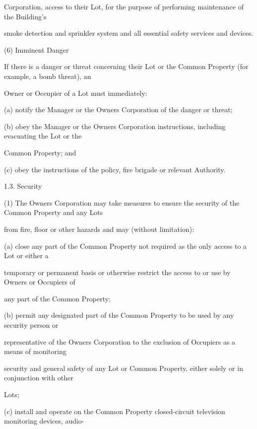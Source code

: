 \documentclass{article}
\begin{document}
{\fontsize{10.02}{1}Corporation, access to their Lot, for the purpose of performing maintenance of the Building’s }

{\fontsize{10.02}{1}smoke detection and sprinkler system and all essential safety services and devices. }

{\fontsize{9.962}{1}(6) Imminent Danger }

{\fontsize{10.02}{1}If there is a danger or threat concerning their Lot or the Common Property (for example, a bomb threat), an }

{\fontsize{10.02}{1}Owner or Occupier of a Lot must immediately: }

{\fontsize{9.962}{1}(a) notify the Manager or the Owners Corporation of the danger or threat; }

{\fontsize{9.962}{1}(b) obey the Manager or the Owners Corporation instructions, including evacuating the Lot or the }

{\fontsize{10.02}{1}Common Property; and }

{\fontsize{9.962}{1}(c) obey the instructions of the policy, fire brigade or relevant Authority. }

{\fontsize{9.99}{1}1.3. Security }

{\fontsize{9.962}{1}(1) The Owners Corporation may take measures to ensure the security of the Common Property and any Lots }

{\fontsize{10.02}{1}from fire, floor or other hazards and may (without limitation): }

{\fontsize{9.962}{1}(a) close any part of the Common Property not required as the only access to a Lot or either a }

{\fontsize{10.02}{1}temporary or permanent basis or otherwise restrict the access to or use by Owners or Occupiers of }

{\fontsize{10.02}{1}any part of the Common Property; }

{\fontsize{9.962}{1}(b) permit any designated part of the Common Property to be used by any security person or }

{\fontsize{10.02}{1}representative of the Owners Corporation to the exclusion of Occupiers as a means of monitoring }

{\fontsize{10.02}{1}security and general safety of any Lot or Common Property, either solely or in conjunction with other }

{\fontsize{10.02}{1}Lots; }

{\fontsize{9.962}{1}(c) install and operate on the Common Property closed-circuit television monitoring devices, audio- }
\end{document}
